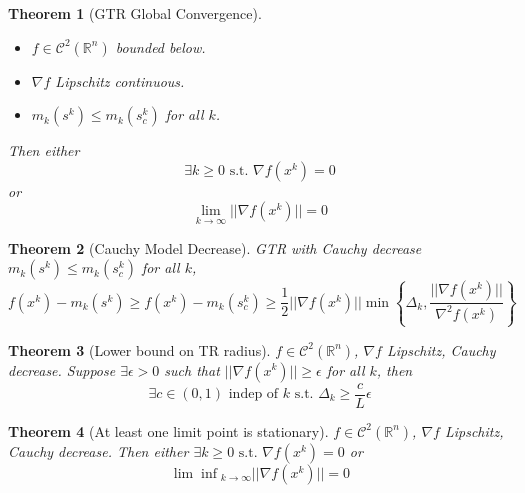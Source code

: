 \documentclass[a4paper]{article}
\newcommand{\R}{\mathbb{R}}
\newcommand{\C}{\mathcal{C}}
\newcommand{\st}{\text{ s.t. }}
\newcommand{\norm}[1]{\lvert \lvert #1 \rvert \rvert}
\newtheorem{theorem}{Theorem}
\begin{document}
\setcounter{theorem}{10}
\begin{theorem}[GTR Global Convergence]
    \phantom \\
    \begin{itemize}
        \item $f \in \C^2 \left( \R^n \right)$ bounded below.
        \item $\nabla f$ Lipschitz continuous.
        \item $m_k \left( s^k \right) \leq m_k \left( s_c^k \right)$ for all $k$.
    \end{itemize}
    Then either
    \begin{equation*}
        \exists k \geq 0 \st \nabla f \left( x^k \right) = 0
    \end{equation*}
    or
    \begin{equation*}
        \lim_{k \rightarrow \infty} \norm{\nabla f \left( x^k \right)} = 0
    \end{equation*}
\end{theorem}

\begin{theorem}[Cauchy Model Decrease]
    GTR with Cauchy decrease $m_k \left( s^k \right) \leq m_k \left( s_c^k \right)$ for all $k$,
    \begin{equation*}
    f\left( x^k \right) - m_k \left( s^k \right) \geq f \left( x^k \right) - m_k \left( s_c^k \right) \geq \frac{1}{2} \norm{\nabla f \left( x^k \right)} \min \left\{ \Delta_k, \frac{\norm{\nabla f \left( x^k \right)}}{\nabla^2 f \left( x^k \right)} \right\}
    \end{equation*}
\end{theorem}

\begin{theorem}[Lower bound on TR radius]
    $f \in \C^2 \left( \R^n \right)$, $\nabla f$ Lipschitz, Cauchy decrease.
    Suppose $\exists \epsilon > 0$ such that $\norm{\nabla f \left( x^k \right)} \geq \epsilon$ for all $k$, then
    \begin{equation*}
        \exists c \in \left( 0, 1 \right) \text{ indep of } k \st \Delta_k \geq \frac{c}{L} \epsilon
    \end{equation*}
\end{theorem}

\begin{theorem}[At least one limit point is stationary]
    $f \in \C^2 \left( \R^n \right)$, $\nabla f$ Lipschitz, Cauchy decrease.
    Then either $\exists k \geq 0 \st \nabla f \left( x^k \right) = 0$ or
    \begin{equation*}
        {\lim \inf}_{k \rightarrow \infty} \norm{\nabla f \left( x^k \right)} = 0
    \end{equation*}
\end{theorem}
\end{document}

